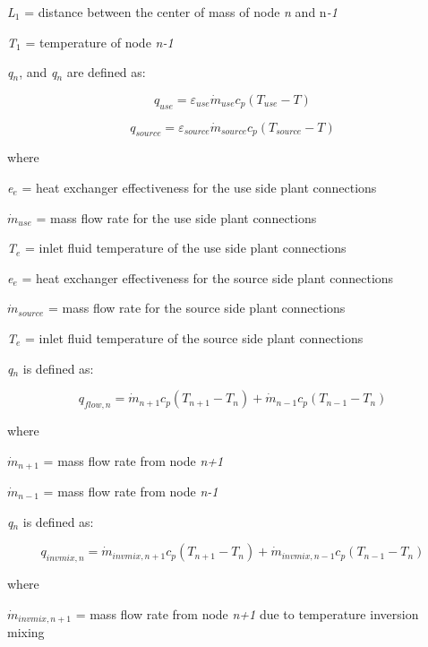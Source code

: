 \emph{L\(_{1}\)} = distance between the center of mass of node \emph{n} and n\emph{-1}

\emph{T\(_{1}\)} = temperature of node \emph{n-1}

\emph{q\(_{n}\)}, and \emph{q\(_{n}\)} are defined as:

\begin{equation}
{q_{use}} = {\varepsilon_{use}}{\dot m_{use}}{c_p}\left( {{T_{use}} - T} \right)
\end{equation}

\begin{equation}
{q_{source}} = {\varepsilon_{source}}{\dot m_{source}}{c_p}\left( {{T_{source}} - T} \right)
\end{equation}

where

\emph{e\(_{e}\)} = heat exchanger effectiveness for the use side plant connections

\({\dot m_{use}}\) = mass flow rate for the use side plant connections

\emph{T\(_{e}\)} = inlet fluid temperature of the use side plant connections

\emph{e\(_{e}\)} = heat exchanger effectiveness for the source side plant connections

\({\dot m_{source}}\) = mass flow rate for the source side plant connections

\emph{T\(_{e}\)} = inlet fluid temperature of the source side plant connections

\emph{q\(_{n}\)} is defined as:

\begin{equation}
{q_{flow,n}} = {\dot m_{n + 1}}{c_p}({T_{n + 1}} - {T_n}) + {\dot m_{n - 1}}{c_p}({T_{n - 1}} - {T_n})
\end{equation}

where

\({\dot m_{n + 1}}\) = mass flow rate from node \emph{n+1}

\({\dot m_{n - 1}}\) = mass flow rate from node \emph{n-1}

\emph{q\(_{n}\)} is defined as:

\begin{equation}
{q_{invmix,n}} = {\dot m_{invmix,n + 1}}{c_p}({T_{n + 1}} - {T_n}) + {\dot m_{invmix,n - 1}}{c_p}({T_{n - 1}} - {T_n})
\end{equation}

where

\({\dot m_{invmix,n + 1}}\) = mass flow rate from node \emph{n+1} due to temperature inversion mixing

